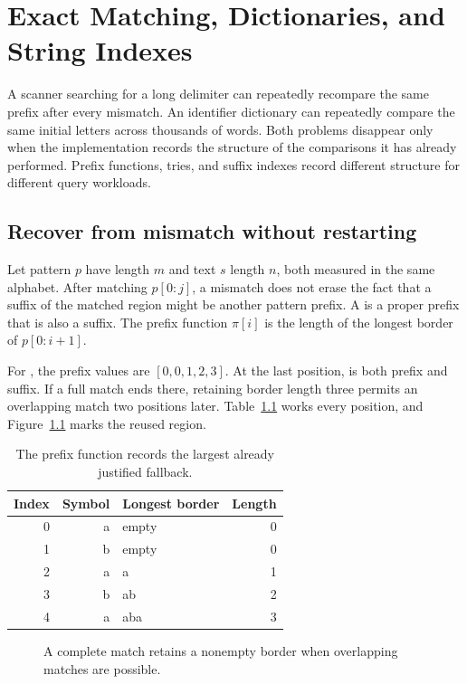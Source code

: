 \chapter{Exact Matching, Dictionaries, and String Indexes}
\label{ch:string-matching-indexes}

A scanner searching for a long delimiter can repeatedly recompare the same prefix after every mismatch.
An identifier dictionary can repeatedly compare the same initial letters across thousands of words.
Both problems disappear only when the implementation records the structure of the comparisons it has already performed.
Prefix functions, tries, and suffix indexes record different structure for different query workloads.

\section{Recover from mismatch without restarting}
\label{sec:ch78-prefix}
Let pattern $p$ have length $m$ and text $s$ length $n$, both measured in the same alphabet.
After matching $p[0:j]$, a mismatch does not erase the fact that a suffix of the matched region might be another pattern prefix.
A  is a proper prefix that is also a suffix.
The prefix function $\pi[i]$ is the length of the longest border of $p[0:i+1]$.

For , the prefix values are $[0,0,1,2,3]$.
At the last position,  is both prefix and suffix.
If a full match ends there, retaining border length three permits an overlapping match two positions later.
Table~\ref{tab:ch78-prefix} works every position, and Figure~\ref{fig:ch78-border} marks the reused region.

\begin{table}[htbp]
\caption{The prefix function records the largest already justified fallback.}
\label{tab:ch78-prefix}
\centering
\begin{tabular}{rrlr}
\toprule
Index & Symbol & Longest border & Length \\
\midrule
0 & a & empty & 0 \\
1 & b & empty & 0 \\
2 & a & a & 1 \\
3 & b & ab & 2 \\
4 & a & aba & 3 \\
\bottomrule
\end{tabular}
\end{table}

\begin{figure}[htbp]
\centering
{}
\caption{A complete match retains a nonempty border when overlapping matches are possible.}
\label{fig:ch78-border}
\end{figure}

